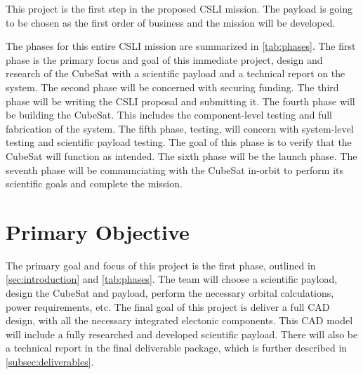 \documentclass[conference]{IEEEtran} %
\begin{document}
This project is the first step in the proposed CSLI mission. The payload is going to be chosen as the first order of business and the mission will be developed.

The phases for this entire CSLI mission are summarized in \autoref{tab:phases}. The first phase is the primary focus and goal of this immediate project, design and
research of the CubeSat with a scientific payload and a technical report on the system. The second phase will be concerned with securing funding. The third phase will be writing the CSLI proposal and submitting it.
The fourth phase will be building the CubeSat. This includes the component-level testing and full fabrication of the system. The fifth phase, testing, will concern with system-level
testing and scientific payload testing. The goal of this phase is to verify that the CubeSat will function as intended. The sixth phase will be the launch phase. The seventh phase
will be communciating with the CubeSat in-orbit to perform its scientific goals and complete the mission.


\section{Primary Objective}
\label{sec:primary-obj}
The primary goal and focus of this project is the first phase, outlined in \autoref{sec:introduction} and \autoref{tab:phases}. The team will
choose a scientific payload, design the CubeSat and payload, perform the necessary orbital calculations, power requirements, etc. The final goal of
this project is deliver a full CAD design, with all the necessary integrated electonic components. This CAD model will include a fully researched and
developed scientific payload. There will also be a technical report in the final deliverable package, which is further described in \autoref{subsec:deliverables}.

\end{document}
